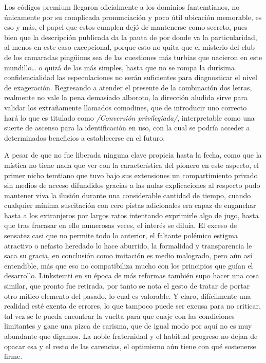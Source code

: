 \documentclass[
]{book}
\begin{document}
Los códigos premium llegaron oficialmente a los dominios fantemtianos, no únicamente por su complicada pronunciación y poco útil ubicación memorable, es eso y más, el papel que estos cumplen dejó de mantenerse como secreto, pues bien que la descripción publicada da la pauta de por donde va la particularidad, al menos en este caso excepcional, porque esto no quita que el misterio del club de los camaradas pingüinos sea de las cuestiones más turbias que nacieron en este mundillo\ldots{} o quizá de las más simples, hasta que no se rompa la durísima confidencialidad las especulaciones no serán suficientes para diagnosticar el nivel de exageración. Regresando a atender el presente de la combinación dos letras, realmente no vale la pena demasiado alboroto, la dirección aludida sirve para validar los extrañamente llamados comodines, que de introducir uno correcto hará lo que es titulado como \emph{/Conversión privilegiada/}, interpretable como una suerte de ascenso para la identificación en uso, con la cual se podría acceder a determinados beneficios a establecerse en el futuro.

A pesar de que no fue liberada ninguna clave propicia hasta la fecha, como que la mística no tiene nada que ver con la característica del pionero en este aspecto, el primer nicho temtiano que tuvo bajo sus extensiones un compartimiento privado sin medios de acceso difundidos gracias a las nulas explicaciones al respecto pudo mantener viva la ilusión durante una considerable cantidad de tiempo, cuando cualquier mínima suscitación con cero pistas adicionales era capaz de enganchar hasta a los extranjeros por largos ratos intentando exprimirle algo de jugo, hasta que tras fracasar en ello numerosas veces, el interés se diluía. El exceso de sensatez casi que no permite todo lo anterior, el faltante polémico estigma atractivo o nefasto heredado lo hace aburrido, la formalidad y transparencia le saca su gracia, en conclusión como imitación es medio malogrado, pero aún así entendible, más que eso no compatibiliza mucho con los principios que guían el desarrollo. Linkstemti en su época de más reformas también supo hacer una cosa similar, que pronto fue retirada, por tanto se nota el gesto de tratar de portar otro mítico elemento del pasado, lo cual es valorable. Y claro, difícilmente una realidad esté exenta de errores, lo que tampoco puede ser excusa para no criticar, tal vez se le pueda encontrar la vuelta para que cuaje con las condiciones limitantes y gane una pizca de carisma, que de igual modo por aquí no es muy abundante que digamos. La noble fraternidad y el habitual progreso no dejan de opacar esa y el resto de las carencias, el optimismo aún tiene con qué sostenerse firme.
\end{document}
